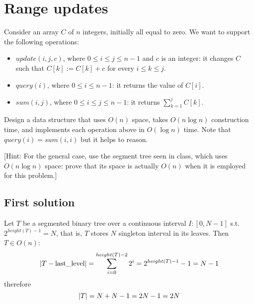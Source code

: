 \section{Range updates}

Consider an array $C$ of $n$ integers, initially all equal to zero. We want to support the following operations:
\begin{itemize}
  \item $update(i, j, c)$, where $0 \leq i \leq j \leq n - 1$ and $c$ is an integer: it changes $C$ such that $C[k] := C[k] + c$ for every $i \leq k \leq j$.
  \item $query(i)$, where $0 \leq i \leq n - 1$: it returns the value of $C[i]$.
  \item $sum(i,j)$, where $0 \leq i \leq j \leq n - 1$: it returns $\sum_{k = 1}^j C[k]$.
\end{itemize}

Design a data structure that uses $O(n)$ space, takes $O(n \log n)$ construction time, and implements each operation above in $O(\log n)$ time. Note that $query(i) = sum(i, i)$ but it helps to reason.

[Hint: For the general case, use the segment tree seen in class, which uses $O(n \log n)$ space: prove that its space is actually $O(n)$ when it is employed for this problem.]

\subsection{First solution}

Let $T$ be a segmented binary tree over a continuous interval $I: [0, N -1]$ s.t. $2^{height(T) - 1} = N$, that is, $T$ stores $N$ singleton interval in its leaves.
Then $T \in O(n)$:
\begin{equation*}
\lvert T - \text{last\_level}\rvert = \sum_{i=0}^{height(T) - 2}2^i = 2^{height(T) - 1} - 1 = N - 1
\end{equation*}
therefore
\begin{equation*}
\lvert T\rvert = N + N - 1 = 2N - 1 = 2N
\end{equation*}


